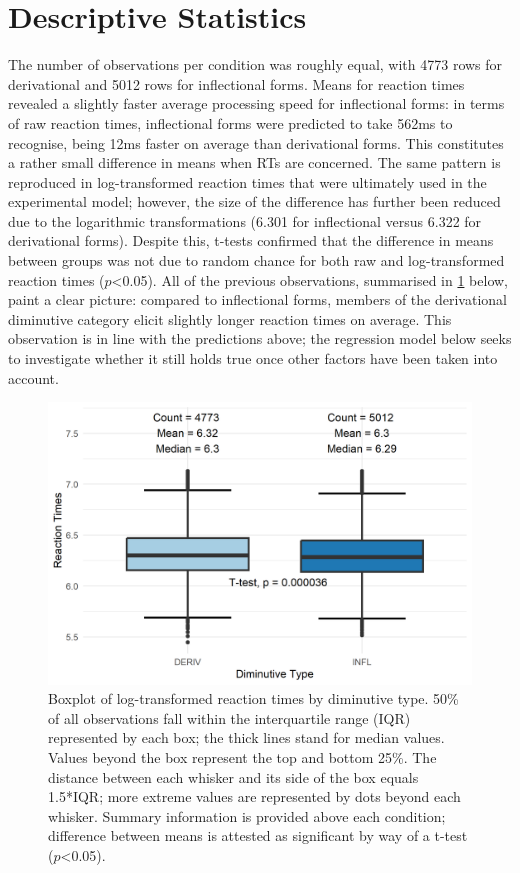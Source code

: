 \section{Descriptive Statistics} 
\label{sec:5-desc_stats}
The number of observations per condition was roughly equal, with 4773 rows for derivational and 5012 rows for inflectional forms. Means for reaction times revealed a slightly faster average processing speed for inflectional forms: in terms of raw reaction times, inflectional forms were predicted to take 562ms to recognise, being 12ms faster on average than derivational forms. This constitutes a rather small difference in means when RTs are concerned. The same pattern is reproduced in log-transformed reaction times that were ultimately used in the experimental model; however, the size of the difference has further been reduced due to the logarithmic transformations (6.301 for inflectional versus 6.322 for derivational forms). Despite this, t-tests confirmed that the difference in means between groups was not due to random chance for both raw and log-transformed reaction times  ($p$<0.05). All of the previous observations, summarised in \ref{fig:boxplot} below, paint a clear picture: compared to inflectional forms, members of the derivational diminutive category elicit slightly longer reaction times on average. This observation is in line with the predictions above; the regression model below seeks to investigate whether it still holds true once other factors have been taken into account. 
\begin{figure}[ht]
    \centering
    \includegraphics[width=\textwidth]{images/dim_box.png}
    \caption[Boxplot of log-transformed reaction times by diminutive type]{Boxplot of log-transformed reaction times by diminutive type. 50\% of all observations fall within the interquartile range (IQR) represented by each box; the thick lines stand for median values. Values beyond the box represent the top and bottom 25\%. The distance between each whisker and its side of the box equals 1.5*IQR; more extreme values are represented by dots beyond each whisker. Summary information is provided above each condition; difference between means is attested as significant by way of a t-test ($p$<0.05).}
    \label{fig:boxplot}
\end{figure}

